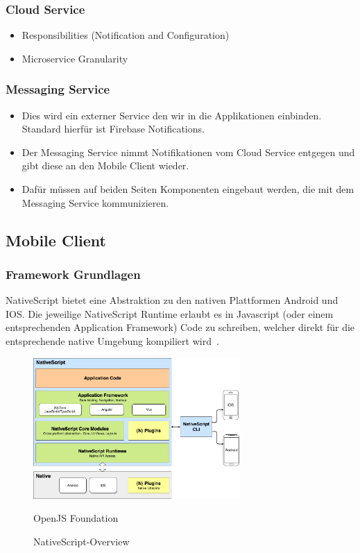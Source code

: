 \subsubsection*{Cloud Service}

\begin{itemize}
    \item Responsibilities (Notification and Configuration)
    \item Microservice Granularity
\end{itemize}


\subsubsection*{Messaging Service}

\begin{itemize}
    \item Dies wird ein externer Service den wir in die Applikationen einbinden. Standard hierfür ist Firebase Notifications.
    \item Der Messaging Service nimmt Notifikationen vom Cloud Service entgegen und gibt diese an den Mobile Client wieder.
    \item Dafür müssen auf beiden Seiten Komponenten eingebaut werden, die mit dem Messaging Service kommunizieren.
\end{itemize}

\clearpage

\subsection{Mobile Client}\label{subsec:mobile-client}

\subsubsection{Framework Grundlagen}
NativeScript bietet eine Abstraktion zu den nativen Plattformen Android und IOS.
Die jeweilige NativeScript Runtime erlaubt es in Javascript (oder einem entsprechenden Application Framework) Code zu schreiben,
welcher direkt für die entsprechende native Umgebung kompiliert wird~\cite{ns-core-overview}.
\begin{figure}[h]
    \centering
    \label{fig:howNSWorks}
    \includegraphics[width=0.7\textwidth]{graphics/ns-common}\caption[NativeScript-Overview]{NativeScript-Overview}\textcopyright OpenJS Foundation
\end{figure}



